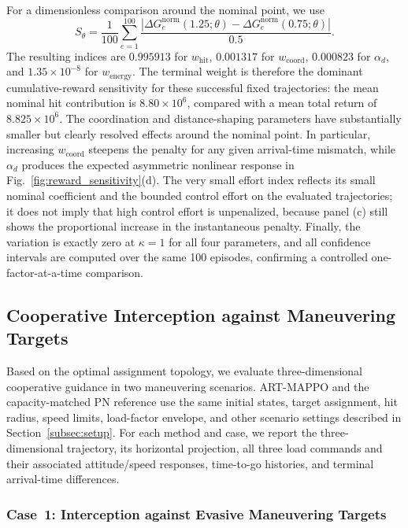 \documentclass[lettersize,journal]{IEEEtran}
\begin{document}
For a dimensionless comparison around the nominal point, we use
\begin{equation}
\label{eq:local_reward_sensitivity}
S_{\theta}=\frac{1}{100}\sum_{e=1}^{100}
\frac{\left|\Delta G_e^{\mathrm{norm}}(1.25;\theta)
-\Delta G_e^{\mathrm{norm}}(0.75;\theta)\right|}{0.5}.
\end{equation}
The resulting indices are $0.995913$ for $w_{\mathrm{hit}}$, $0.001317$ for
$w_{\mathrm{coord}}$, $0.000823$ for $\alpha_d$, and
$1.35\times10^{-8}$ for $w_{\mathrm{energy}}$. The terminal weight is therefore the
dominant cumulative-reward sensitivity for these successful fixed trajectories: the mean
nominal hit contribution is $8.80\times10^6$, compared with a mean total return of
$8.825\times10^6$. The coordination and distance-shaping parameters have substantially
smaller but clearly resolved effects around the nominal point. In particular, increasing
$w_{\mathrm{coord}}$ steepens the penalty for any given arrival-time mismatch, while
$\alpha_d$ produces the expected asymmetric nonlinear response in
Fig.~\ref{fig:reward_sensitivity}(d). The very small effort index reflects its small nominal
coefficient and the bounded control effort on the evaluated trajectories; it does not imply
that high control effort is unpenalized, because panel (c) still shows the proportional
increase in the instantaneous penalty. Finally, the variation is exactly zero at
$\kappa=1$ for all four parameters, and all confidence intervals are computed over the same
100 episodes, confirming a controlled one-factor-at-a-time comparison.
\endgroup

\begingroup\color{blue}
\subsection{Cooperative Interception against Maneuvering Targets}
\label{subsec:cases}

Based on the optimal assignment topology, we evaluate three-dimensional cooperative guidance
in two maneuvering scenarios. ART-MAPPO and the capacity-matched PN reference use the same
initial states, target assignment, hit radius, speed limits, load-factor envelope, and other
scenario settings described in Section~\ref{subsec:setup}. For each
method and case, we report the three-dimensional trajectory, its horizontal projection, all
three load commands and their associated attitude/speed responses, time-to-go histories, and
terminal arrival-time differences.

\subsubsection{Case~1: Interception against Evasive Maneuvering Targets}
\end{document}
